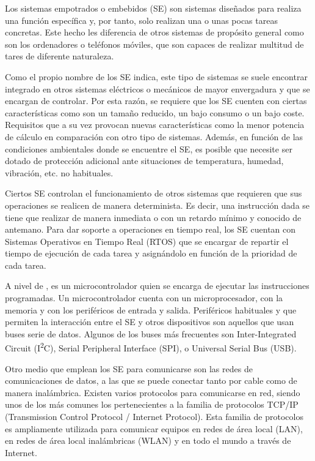 \label{ch:introduccion}
Los sistemas empotrados o embebidos (SE) son sistemas diseñados para realiza una
función específica y, por tanto, solo realizan una o unas pocas tareas
concretas. Este hecho les diferencia de otros sistemas de propósito general como
son los ordenadores o teléfonos móviles, que son capaces de realizar multitud de
tares de diferente naturaleza. 

Como el propio nombre de los SE indica, este tipo de sistemas se suele encontrar
integrado en otros sistemas eléctricos o mecánicos de mayor envergadura y que se
encargan de controlar. Por esta razón, se requiere que los SE cuenten con 
ciertas características como son un tamaño reducido, un bajo consumo o un bajo
coste. Requisitos que a su vez provocan nuevas características como la menor
potencia de cálculo en comparación con otro tipo de sistemas. Además, en función
de las condiciones ambientales donde se encuentre el SE, es posible que necesite
ser dotado de protección adicional ante situaciones de temperatura, humedad,
vibración, etc. no habituales.

Ciertos SE controlan el funcionamiento de otros sistemas que requieren que sus
operaciones se realicen de manera determinista. Es decir, una instrucción dada
se tiene que realizar de manera inmediata o con un retardo mínimo y conocido de
antemano. Para dar soporte a operaciones en tiempo real, los SE cuentan con
Sistemas Operativos en Tiempo Real (RTOS) que se encargar de repartir el tiempo
de ejecución de cada tarea y asignándolo en función de la prioridad de cada
tarea.

A nivel de , es un microcontrolador quien se encarga de
ejecutar las instrucciones programadas. Un microcontrolador cuenta con un
microprocesador, con la memoria y con los periféricos de entrada y salida.
Periféricos habituales y que permiten la interacción entre el SE y otros
dispositivos son aquellos que usan buses serie de datos. Algunos de los buses
más frecuentes son Inter-Integrated Circuit (I\textsuperscript{2}C), Serial
Peripheral Interface (SPI), o Universal Serial Bus (USB).

Otro medio que emplean los SE para comunicarse son las redes de comunicaciones
de datos, a las que se puede conectar tanto por cable como de manera
inalámbrica. Existen varios protocolos para comunicarse en red, siendo unos de
los más comunes los pertenecientes a la familia de protocolos TCP/IP
(Transmission Control Protocol / Internet Protocol). Esta familia de protocolos
es ampliamente utilizada para comunicar equipos en redes de área local (LAN), en
redes de área local inalámbricas (WLAN) y en todo el mundo a través de Internet.

